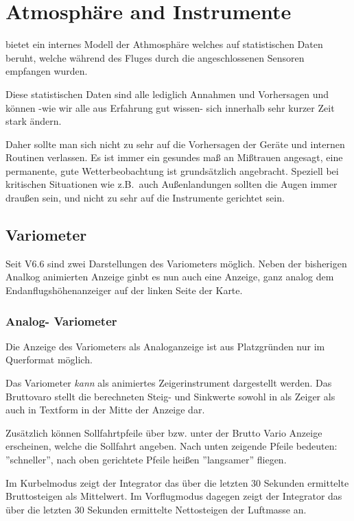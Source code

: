 \chapter{Atmosphäre and Instrumente}\label{cha:atmosph}
\xc bietet ein internes Modell der Athmosphäre welches auf statistischen Daten beruht,
welche während des Fluges durch die angeschlossenen Sensoren empfangen wurden.

Diese statistischen Daten sind alle lediglich Annahmen und Vorhersagen und können -wie wir alle
aus Erfahrung gut wissen-  sich innerhalb sehr kurzer Zeit stark ändern.

Daher sollte man sich nicht zu sehr auf die Vorhersagen der Geräte und internen Routinen verlassen.
Es ist immer ein gesundes maß an Mißtrauen angesagt, eine permanente, gute Wetterbeobachtung
ist grundsätzlich angebracht. Speziell bei kritischen Situationen wie z.B.\ auch
Außenlandungen sollten die Augen immer draußen sein, und nicht zu sehr auf die Instrumente
gerichtet sein.
\section{Variometer}
Seit V6.6 sind zwei Darstellungen des Variometers möglich. Neben der bisherigen Analkog animierten Anzeige ginbt es nun auch eine Anzeige, ganz analog dem Endanflugshöhenanzeiger auf der linken Seite der Karte. 

\subsection*{Analog- Variometer}
Die Anzeige des Variometers als Analoganzeige ist aus Platzgründen nur im Querformat möglich.

Das Variometer \textsl{kann} als animiertes Zeigerinstrument dargestellt werden.
Das Bruttovaro stellt die berechneten Steig- und Sinkwerte sowohl in als Zeiger als
auch in Textform in der Mitte der Anzeige dar.

Zusätzlich können Sollfahrtpfeile über bzw. unter der Brutto Vario Anzeige erscheinen,
welche die Sollfahrt angeben. Nach unten zeigende Pfeile bedeuten: ''schneller'', nach oben
gerichtete Pfeile heißen ''langsamer'' fliegen.

Im Kurbelmodus zeigt der Integrator das über die letzten 30 Sekunden ermittelte Bruttosteigen als Mittelwert.
Im Vorflugmodus dagegen zeigt der Integrator das über die letzten 30 Sekunden ermittelte Nettosteigen der Luftmasse an.

